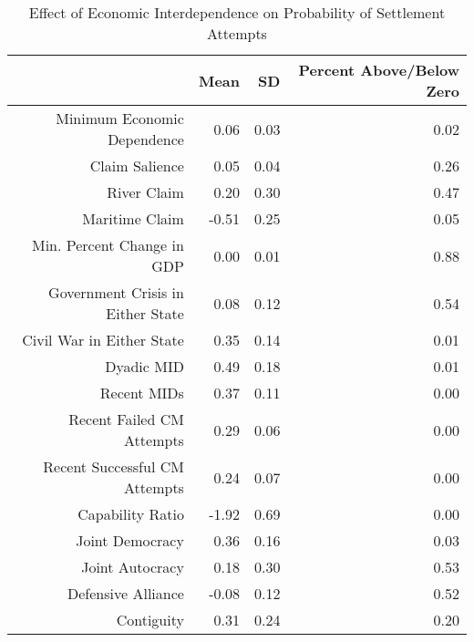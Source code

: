 \documentclass[../../dissertation.tex]{subfiles}
\begin{document}
\begin{table}[ht]

\caption{Effect of Economic Interdependence on Probability of Settlement Attempts}

\label{tab: attempts}

\centering

\begin{tabular}{rrrr}

\toprule

& Mean & SD & Percent Above/Below Zero \\ 

\midrule

Minimum Economic Dependence & 0.06 & 0.03 & 0.02 \\ 

Claim Salience & 0.05 & 0.04 & 0.26 \\ 

River Claim & 0.20 & 0.30 & 0.47 \\ 

Maritime Claim & -0.51 & 0.25 & 0.05 \\ 

Min. Percent Change in GDP & 0.00 & 0.01 & 0.88 \\ 

Government Crisis in Either State & 0.08 & 0.12 & 0.54 \\ 

Civil War in Either State & 0.35 & 0.14 & 0.01 \\ 

Dyadic MID & 0.49 & 0.18 & 0.01 \\ 

Recent MIDs & 0.37 & 0.11 & 0.00 \\ 

Recent Failed CM Attempts & 0.29 & 0.06 & 0.00 \\ 

Recent Successful CM Attempts & 0.24 & 0.07 & 0.00 \\ 

Capability Ratio & -1.92 & 0.69 & 0.00 \\ 

Joint Democracy & 0.36 & 0.16 & 0.03 \\ 

Joint Autocracy & 0.18 & 0.30 & 0.53 \\ 

Defensive Alliance & -0.08 & 0.12 & 0.52 \\ 

Contiguity & 0.31 & 0.24 & 0.20 \\ 


\end{tabular}
\end{table}
\end{document}
